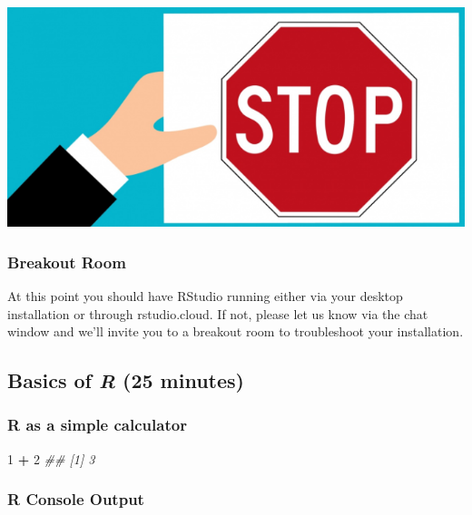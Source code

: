 \documentclass[
]{book}
\newenvironment{Shaded}{\begin{snugshade}}{\end{snugshade}}
\newcommand{\CommentTok}[1]{\textcolor[rgb]{0.56,0.35,0.01}{\textit{#1}}}
\newcommand{\DecValTok}[1]{\textcolor[rgb]{0.00,0.00,0.81}{#1}}
\newcommand{\OperatorTok}[1]{\textcolor[rgb]{0.81,0.36,0.00}{\textbf{#1}}}
\newcommand{\StringTok}[1]{\textcolor[rgb]{0.31,0.60,0.02}{#1}}
\begin{document}
\includegraphics{images/breakout_stop.png}

\hypertarget{breakout-room}{%
\subsubsection*{Breakout Room}\label{breakout-room}}

At this point you should have RStudio running either via your desktop installation or through rstudio.cloud. If not, please let us know via the chat window and we'll invite you to a breakout room to troubleshoot your installation.

\hypertarget{basics-of-r-25-minutes}{%
\subsection{\texorpdfstring{Basics of \emph{R} (25 minutes)}{Basics of R (25 minutes)}}\label{basics-of-r-25-minutes}}

\hypertarget{r-as-a-simple-calculator}{%
\subsubsection*{R as a simple calculator}\label{r-as-a-simple-calculator}}

\begin{Shaded}
\begin{Highlighting}[]
\DecValTok{1} \OperatorTok{+}\StringTok{ }\DecValTok{2}
\CommentTok{## [1] 3}
\end{Highlighting}
\end{Shaded}

\hypertarget{r-console-output}{%
\subsubsection*{R Console Output}\label{r-console-output}}
\end{document}
